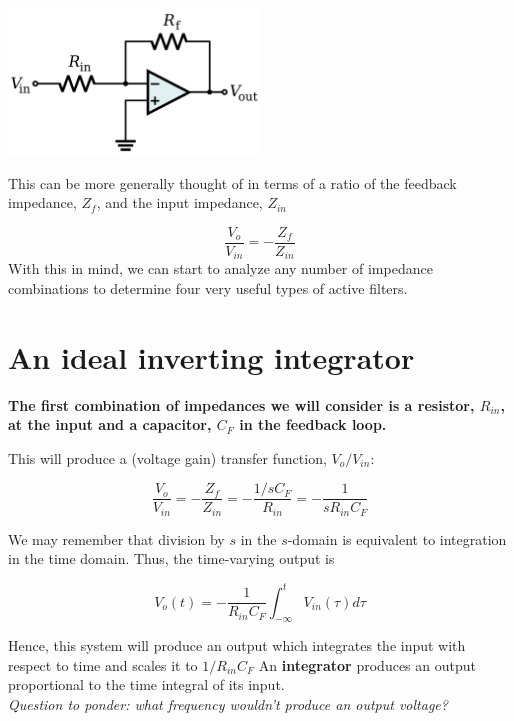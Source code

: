 \documentclass[11pt]{book}
\begin{document}
\begin{center}
	\includegraphics[width=0.5\textwidth]{figures/15.01.png}
\end{center}
This can be more generally thought of in terms of a ratio of the feedback impedance, $Z_f$, and the input impedance, $Z_{in}$

\begin{equation}
	\frac{V_o}{V_{in}} = -\frac{Z_f}{Z_{in}}
\end{equation}
With this in mind, we can start to analyze any number of impedance combinations to determine four very useful types of active filters.

\section{An ideal inverting integrator}
\textbf{The first combination of impedances we will consider is a resistor, $R_{in}$, at the input and a capacitor, $C_F$ in the feedback loop.}

This will produce a (voltage gain) transfer function, $V_o/V_{in}$:

\begin{equation}
	\frac{V_o}{V_{in}} = -\frac{Z_f}{Z_{in}} = -\frac{1/sC_F}{R_{in}} = -\frac{1}{sR_{in}C_F}
\end{equation}

We may remember that division by $s$ in the $s$-domain is equivalent to integration in the time domain. Thus, the time-varying output is 

\begin{equation}
	V_o(t) = -\frac{1}{R_{in}C_F}\int_{-\infty}^{t} V_{in}(\tau)d\tau
\end{equation}

Hence, this system will produce an output which integrates the input with respect to time and scales it to $1/R_{in}C_F$
An \textbf{integrator} produces an output proportional to the time integral of its input.
\\

\textit{Question to ponder: what frequency wouldn't produce an output voltage?}
\end{document}
